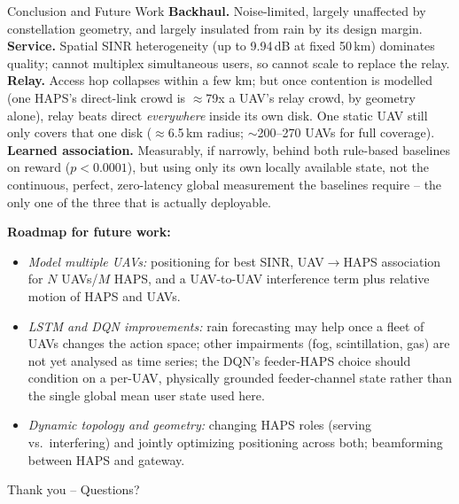 \documentclass[aspectratio=169]{beamer}
\begin{document}
\begin{frame}{Conclusion and Future Work}
\scriptsize
\textbf{Backhaul.} Noise-limited, largely unaffected by constellation
geometry, and largely insulated from rain by its design margin.
\quad
\textbf{Service.} Spatial SINR heterogeneity (up to 9.94\,dB at fixed
50\,km) dominates quality; cannot multiplex simultaneous users, so
cannot scale to replace the relay.
\quad
\textbf{Relay.} Access hop collapses within a few km; but once
contention is modelled (one HAPS's direct-link crowd is $\approx$79x
a UAV's relay crowd, by geometry alone), relay beats direct
\emph{everywhere} inside its own disk. One static UAV still only
covers that one disk ($\approx$6.5\,km radius; $\sim$200--270 UAVs
for full coverage).
\quad
\textbf{Learned association.} Measurably, if narrowly, behind both
rule-based baselines on reward ($p<0.0001$), but using only its own
locally available state, not the continuous, perfect, zero-latency
global measurement the baselines require -- the only one of the three
that is actually deployable.

\vspace{2mm}
\textbf{Roadmap for future work:}
\begin{itemize}\setlength{\itemsep}{0pt}
  \item \emph{Model multiple UAVs:} positioning for best SINR,
        UAV$\to$HAPS association for $N$ UAVs/$M$ HAPS, and a
        UAV-to-UAV interference term plus relative motion of HAPS
        and UAVs.
  \item \emph{LSTM and DQN improvements:} rain forecasting may help
        once a fleet of UAVs changes the action space; other
        impairments (fog, scintillation, gas) are not yet analysed as
        time series; the DQN's feeder-HAPS choice should condition on
        a per-UAV, physically grounded feeder-channel state rather
        than the single global mean user state used here.
  \item \emph{Dynamic topology and geometry:} changing HAPS roles
        (serving vs.\ interfering) and jointly optimizing positioning
        across both; beamforming between HAPS and gateway.
\end{itemize}

\vspace{2mm}
\centering \large Thank you -- Questions?
\end{frame}
\end{document}

